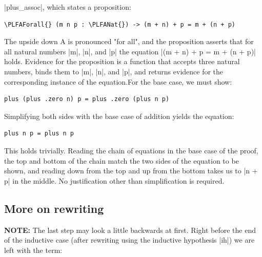 \documentclass{memoir}
\newcommand{\PLFANat}{\ensuremath{\mathbb{N}}}
\newcommand{\PLFAForall}{\ensuremath{\forall}}
\begin{document}
\LeanVerb|plus_assoc|, which states a proposition:\begin{verbatim}
\PLFAForall{} (m n p : \PLFANat{}) -> (m + n) + p = m + (n + p)
\end{verbatim}
The upside down A is pronounced "for all", and the proposition asserts that for
all natural numbers \LeanVerb|m|, \LeanVerb|n|, and \LeanVerb|p| the equation \LeanVerb|(m + n) + p = m + (n + p)|
holds. Evidence for the proposition is a function that accepts three natural
numbers, binds them to \LeanVerb|m|, \LeanVerb|n|, and \LeanVerb|p|, and returns evidence for the
corresponding instance of the equation.For the base case, we must show:\begin{verbatim}
plus (plus .zero n) p = plus .zero (plus n p)
\end{verbatim}
Simplifying both sides with the base case of addition yields the equation:\begin{verbatim}
plus n p = plus n p
\end{verbatim}
This holds trivially. Reading the chain of equations in the base case of the
proof, the top and bottom of the chain match the two sides of the equation to
be shown, and reading down from the top and up from the bottom takes us to
\LeanVerb|n + p| in the middle. No justification other than simplification is required.

\par

\subsection{More on rewriting}\label{PLFA--in--Lean----Part--1----Induction-005F-005F-005F--Proof--by--Induction----More--on--rewriting}

\par
\textbf{NOTE:} The last step may look a little backwards at first. Right before the end
of the inductive case (after rewriting using the inductive hypothesis \LeanVerb|ih|)
we are left with the term:
\end{document}
